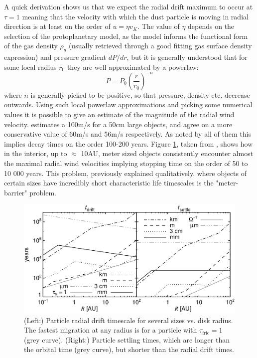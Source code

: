 \documentclass[12pt]{article}
\begin{document}
A quick derivation shows us that we expect the radial drift maximum to occur at $\tau=1$ meaning that the velocity with which the dust particle is moving in radial direction is at least on the order of $u=\eta v_K$. The value of $\eta$ depends on the selection of the protoplanetary model, as the model informs the functional form of the gas density $\rho_g$ (usually retrieved through a good fitting gas surface density expression) and pressure gradient $dP/dr$, but it is generally understood that for some local radius $r_0$ they are well approximated by a powerlaw: 
$$P = P_0 \left(\frac{r}{r_0}\right)^{-n}$$
where $n$ is generally picked to be positive, so that pressure, density etc. decrease outwards. Using such local powerlaw approximations and picking some numerical values it is possible to give an estimate of the magnitude of the radial wind velocity. \citet{Weidenschilling77} estimates a 100m/s for a 50cm large objects, \cite{Armitage07} and \cite{LesHouches} agree on a more conservative value of 60m/s and 56m/s respectively. As noted by all of them this implies decay times on the order 100-200 years. Figure \ref{fig:drifttimes}, taken from \cite{LesHouches}, shows how in the interior, up to $\approx$ 10AU, meter sized objects consistently encounter almost the maximal radial wind velocities implying stopping time on the order of 50 to 10 000 years. This problem, previously explained qualitatively, where objects of certain sizes have incredibly short characteristic life timescales  is the "meter-barrier" problem.
\begin{figure}[htbp]
    \label{fig:drifttimes}
    \centering
    \includegraphics[width=0.8\linewidth]{drifttimesnotxt.png}
    \caption{(Left:) Particle radial drift timescale for several sizes vs. disk radius. The fastest migration at any radius is for a particle with $\tau_\mathrm{fric} = 1$ (grey curve). (Right:) Particle settling times, which are longer than the orbital time (grey curve), but shorter than the radial drift times.}
\end{figure}
\end{document}
